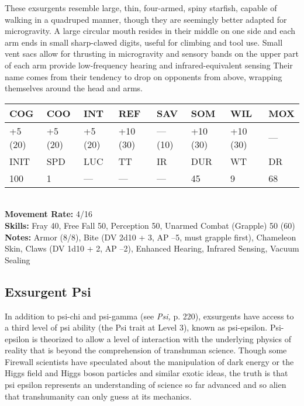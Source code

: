 These exsurgents resemble large, thin, four-armed, spiny starfish, capable of walking in a quadruped manner, though they are seemingly better adapted for microgravity. A large circular mouth resides in their middle on one side and each arm ends in small sharp-clawed digits, useful for climbing and tool use. Small vent sacs allow for thrusting in microgravity and sensory bands on the upper part of each arm provide low-frequency hearing and infrared-equivalent sensing Their name comes from their tendency to drop on opponents from above, wrapping themselves around the head and arms. \\ \begin{tabular}{|l|l|l|l|l|l|l|l|} \hline

COG &COO &INT &REF &SAV &SOM &WIL &MOX \\ \hline

+5 (20) &+5 (20) &+5 (20) &+10 (30) &— (10) &+10 (30) &+10 (30) &— \\ \hline

INIT &SPD &LUC &TT &IR &DUR &WT &DR \\ \hline

100 &1 &— &— &— &45 &9 &68 \\ \hline

\end{tabular} \\ \textbf{Movement Rate:} 4/16 \\ \textbf{Skills:} Fray 40, Free Fall 50, Perception 50, Unarmed Combat (Grapple) 50 (60) \\ \textbf{Notes: }Armor (8/8), Bite (DV 2d10 + 3, AP –5, must grapple first), Chameleon Skin, Claws (DV 1d10 + 2, AP –2), Enhanced Hearing, Infrared Sensing, Vacuum Sealing 



\subsection{Exsurgent Psi } 

In addition to psi-chi and psi-gamma (see \textit{Psi,} p. 220), exsurgents have access to a third level of psi ability (the Psi trait at Level 3), known as psi-epsilon. Psi-epsilon is theorized to allow a level of interaction with the underlying physics of reality that is beyond the comprehension of transhuman science. Though some Firewall scientists have speculated about the manipulation of dark energy or the Higgs field and Higgs boson particles and similar exotic ideas, the truth is that psi epsilon represents an understanding of science so far advanced and so alien that transhumanity can only guess at its mechanics. 

